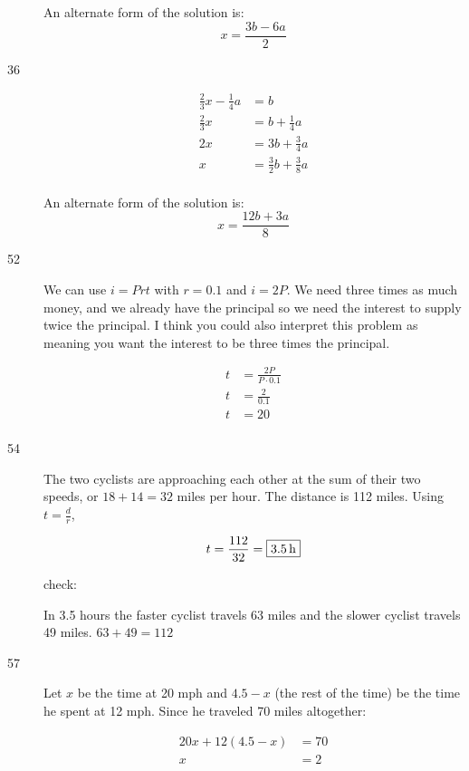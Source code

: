 \documentclass[letterpaper, landscape]{exam}
\begin{document}
\begin{description}
      An alternate form of the solution is: 
      \[
        \boxed{ x = \frac{3b - 6a}{2} } 
      \]

      \item[36]
      \begin{align*}
        \frac{2}{3}x - \frac{1}{4}a    & = b \\
        \frac{2}{3}x                   & = b + \frac{1}{4}a \\
        2x                             & = 3b + \frac{3}{4}a \\
        x                              & = \boxed{ \frac{3}{2} b + \frac{3}{8} a } \\
      \end{align*}

      An alternate form of the solution is: 
      \[
        \boxed{ x = \frac{12b + 3a}{8} }
      \]

      \item[52] We can use $i = Prt$ with $r = 0.1$ and $i = 2P$.  We need three times as much money, and we already have
        the principal so we need the interest to supply twice the principal.  I think you could also interpret this
        problem as meaning you want the interest to be three times the principal.

        \begin{align*}
          t & = \frac{2P}{P \cdot 0.1} \\
          t & = \frac{2}{0.1} \\
          t & = \boxed{ 20 } \\
        \end{align*}

      \item[54] The two cyclists are approaching each other at the sum of their two speeds, or \(18 + 14 = 32\) miles per
        hour.  The distance is 112 miles.  Using $t = \frac{d}{r}$, 
        
        \[
          t = \frac{112}{32} = \boxed{ \unit[3.5]{h} }
        \]

        check:
        
        In 3.5 hours the faster cyclist travels 63 miles and the slower cyclist travels 49 miles.  
        $63 + 49 = 112$

      \item[57] Let $x$ be the time at 20 mph and $4.5 - x$ (the rest of the time) be the time he spent at 12 mph.  Since he
        traveled 70 miles altogether:

        \begin{align*}
          20x + 12(4.5 - x) & = 70 \\
          x                 & = \boxed{ 2 } \\
        \end{align*}


\end{description}
\end{document}
